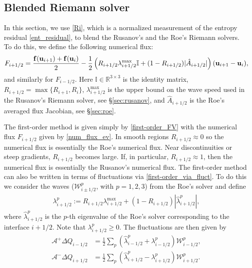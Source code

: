 \documentclass[preprint, 11pt]{article}
\newcommand{\W}{{\mathcal W}}
\newcommand{\A}{{\mathcal A}}
\newcommand{\bff}{{\bf f}}
\newcommand{\bfu}{{\bf u}}
\begin{document}
\subsection{Blended Riemann solver}\label{sec:blended_rs}
In this section, we use \eqref{Ri}, which is a normalized measurement of the entropy residual \eqref{ent_residual}, 
to blend the Rusanov's and the Roe's Riemann solvers. To do this, we define the following numerical flux:
\begin{align}\label{num_flux_ev}
  F_{i+1/2} = \frac{\bff(\bfu_{i+1})+\bff(\bfu_i)}{2} 
  - \frac{1}{2} \left( R_{i+1/2}\lambda_{i+1/2}^{\max}\mathbb{I} + (1-R_{i+1/2})|\hat A_{i+1/2}| \right)(\bfu_{i+1}-\bfu_{i}),
\end{align}
and similarly for $F_{i-1/2}$. Here $\mathbb{I}\in\mathbb{R}^{3\times 3}$ is the identity matrix,
$R_{i+1/2}=\max\{R_{i+1},R_i\}$, $\lambda_{i+1/2}^{\max}$ is the 
upper bound on the wave speed used in the Rusanov's Riemann solver, see \S \ref{sec:rusanov}, 
and $\hat A_{i+1/2}$ is the Roe's averaged flux Jacobian, see \S \ref{sec:roe}. 

The first-order method is given simply by \eqref{first-order_FV} 
with the numerical flux $F_{i+1/2}$ given by \eqref{num_flux_ev}. 
In smooth regions $R_{i+1/2}\approx 0$ so the numerical flux is essentially the Roe's numerical flux. 
Near discontinuities or steep gradients, $R_{i+1/2}$ becomes large. If, in particular, $R_{i+1/2}\approx 1$, 
then the numerical flux is essentially the Rusanov's numerical flux.  
%
The first-order method can also be written in terms of fluctuations via \eqref{first-order_via_fluct}. 
To do this we consider the waves ($\W^p_{i\pm 1/2}$, with $p=1,2,3$) 
from the Roe's solver and define 
\begin{align}\label{lambda_p}
  \lambda_{i+1/2}^p := R_{i+1/2}\lambda_{i+1/2}^{\max} + (1-R_{i+1/2})|\hat \lambda_{i+1/2}^p|,
\end{align}
where $\hat\lambda_{i+1/2}^p$ is the $p$-th eigenvalue of the Roe's solver corresponding to the 
interface $i+1/2$. Note that $\lambda_{i+1/2}^p\geq 0$.
The fluctuations are then given by 
\begin{subequations}\label{ev_fluctuations}
\begin{align}
  \A^+\Delta Q_{i-1/2}&=\frac{1}{2}\sum_p \left(\hat\lambda_{i-1/2}^p + \lambda_{i-1/2}^p\right)\W_{i-1/2}^p, \\
  \A^-\Delta Q_{i+1/2}&=\frac{1}{2}\sum_p \left(\hat\lambda_{i+1/2}^p - \lambda_{i+1/2}^p\right)\W_{i+1/2}^p.
\end{align}
\end{subequations}
\end{document}

